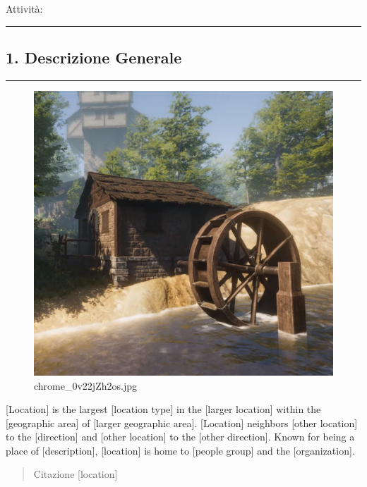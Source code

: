 Attività:

\begin{center}\rule{0.5\linewidth}{0.5pt}\end{center}

\subsection{1. Descrizione Generale}\label{descrizione-generale}

\begin{center}\rule{0.5\linewidth}{0.5pt}\end{center}

\begin{figure}
\centering
\includegraphics{chrome_0v22jZh2os.jpg}
\caption{chrome\_0v22jZh2os.jpg}
\end{figure}

{[}Location{]} is the largest {[}location type{]} in the {[}larger
location{]} within the {[}geographic area{]} of {[}larger geographic
area{]}. {[}Location{]} neighbors {[}other location{]} to the
{[}direction{]} and {[}other location{]} to the {[}other direction{]}.
Known for being a place of {[}description{]}, {[}location{]} is home to
{[}people group{]} and the {[}organization{]}.

\begin{quote}
Citazione {[}location{]}
\end{quote}

